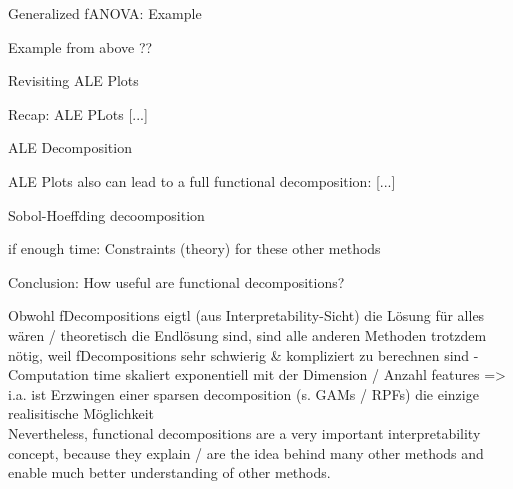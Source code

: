 \documentclass[11pt,compress,t,notes=noshow, aspectratio=169, xcolor=table]{beamer}
\begin{document}
\begin{frame}{Generalized fANOVA: Example}

    Example from above ??
    
\end{frame}

\begin{frame}{Revisiting ALE Plots}

    Recap: ALE PLots [...]
    
\end{frame}

\begin{frame}{ALE Decomposition}
    
    ALE Plots also can lead to a full functional decomposition: [...]
    
\end{frame}

\begin{frame}{Sobol-Hoeffding decoomposition}
    
\end{frame}

\begin{frame}{if enough time: Constraints (theory) for these other methods}
    
\end{frame}

\begin{frame}{Conclusion: How useful are functional decompositions?}

    Obwohl fDecompositions eigtl (aus Interpretability-Sicht) die Lösung für alles wären / theoretisch die Endlösung sind, sind alle anderen Methoden trotzdem nötig, weil fDecompositions sehr schwierig \& kompliziert zu berechnen sind
      - Computation time skaliert exponentiell mit der Dimension / Anzahl features  =>  i.a. ist Erzwingen einer sparsen decomposition (s. GAMs / RPFs) die einzige realisitische Möglichkeit \\

    Nevertheless, functional decompositions are a very important interpretability concept, because they explain / are the idea behind many other methods and enable much better understanding of other methods.
    
\end{frame}










\endlecture
\end{document}
